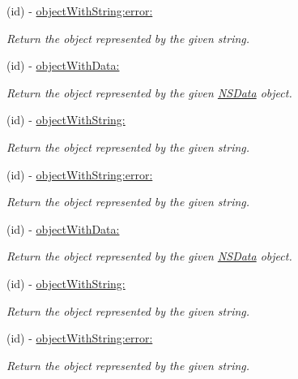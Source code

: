 \begin{DoxyCompactItemize}
(id) -\/ \hyperlink{interface_s_b_json_parser_a7a7fff47f41a08fa0defc4f628846e15}{object\-With\-String\-:error\-:}
\begin{DoxyCompactList}\small\item\em \-Return the object represented by the given string. \end{DoxyCompactList}\item 
(id) -\/ \hyperlink{interface_s_b_json_parser_a66d7be591cdf0d9ee85c21c863ef5cbf}{object\-With\-Data\-:}
\begin{DoxyCompactList}\small\item\em \-Return the object represented by the given \hyperlink{class_n_s_data}{\-N\-S\-Data} object. \end{DoxyCompactList}\item 
(id) -\/ \hyperlink{interface_s_b_json_parser_a1ec40b986576044d58d30172b141c74c}{object\-With\-String\-:}
\begin{DoxyCompactList}\small\item\em \-Return the object represented by the given string. \end{DoxyCompactList}\item 
(id) -\/ \hyperlink{interface_s_b_json_parser_a7a7fff47f41a08fa0defc4f628846e15}{object\-With\-String\-:error\-:}
\begin{DoxyCompactList}\small\item\em \-Return the object represented by the given string. \end{DoxyCompactList}\item 
(id) -\/ \hyperlink{interface_s_b_json_parser_a66d7be591cdf0d9ee85c21c863ef5cbf}{object\-With\-Data\-:}
\begin{DoxyCompactList}\small\item\em \-Return the object represented by the given \hyperlink{class_n_s_data}{\-N\-S\-Data} object. \end{DoxyCompactList}\item 
(id) -\/ \hyperlink{interface_s_b_json_parser_a1ec40b986576044d58d30172b141c74c}{object\-With\-String\-:}
\begin{DoxyCompactList}\small\item\em \-Return the object represented by the given string. \end{DoxyCompactList}\item 
(id) -\/ \hyperlink{interface_s_b_json_parser_a7a7fff47f41a08fa0defc4f628846e15}{object\-With\-String\-:error\-:}
\begin{DoxyCompactList}\small\item\em \-Return the object represented by the given string. \end{DoxyCompactList}\item 

\end{DoxyCompactItemize}

